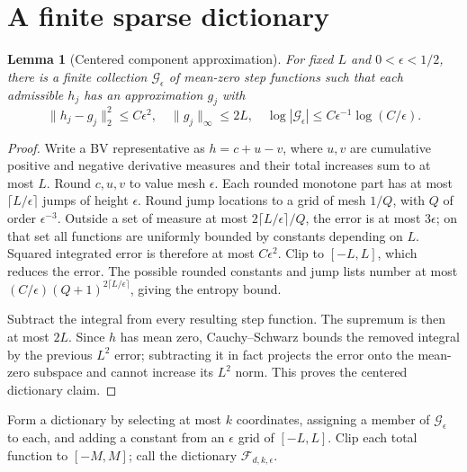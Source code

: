 \documentclass[11pt]{article}
\newtheorem{lemma}[theorem]{Lemma}
\theoremstyle{remark}
\begin{document}
\section{A finite sparse dictionary}
\begin{lemma}[Centered component approximation]\label{component}
For fixed $L$ and $0<\epsilon<1/2$, there is a finite collection $\mathcal G_\epsilon$ of mean-zero step functions such that each admissible $h_j$ has an approximation $g_j$ with
\[
 \|h_j-g_j\|_2^2\leq C\epsilon^2,
 \quad \|g_j\|_\infty\leq2L,
 \quad \log|\mathcal G_\epsilon|
                 \leq C\epsilon^{-1}\log(C/\epsilon).
\]
\end{lemma}
\begin{proof}
Write a BV representative as $h=c+u-v$, where $u,v$ are cumulative positive and negative derivative measures and their total increases sum to at most $L$. Round $c,u,v$ to value mesh $\epsilon$. Each rounded monotone part has at most $\lceil L/\epsilon\rceil$ jumps of height $\epsilon$. Round jump locations to a grid of mesh $1/Q$, with $Q$ of order $\epsilon^{-3}$. Outside a set of measure at most $2\lceil L/\epsilon\rceil/Q$, the error is at most $3\epsilon$; on that set all functions are uniformly bounded by constants depending on $L$. Squared integrated error is therefore at most $C\epsilon^2$. Clip to $[-L,L]$, which reduces the error. The possible rounded constants and jump lists number at most $(C/\epsilon)(Q+1)^{2\lceil L/\epsilon\rceil}$, giving the entropy bound.

Subtract the integral from every resulting step function. The supremum is then at most $2L$. Since $h$ has mean zero, Cauchy--Schwarz bounds the removed integral by the previous $L^2$ error; subtracting it in fact projects the error onto the mean-zero subspace and cannot increase its $L^2$ norm. This proves the centered dictionary claim.
\end{proof}

Form a dictionary by selecting at most $k$ coordinates, assigning a member of $\mathcal G_\epsilon$ to each, and adding a constant from an $\epsilon$ grid of $[-L,L]$. Clip each total function to $[-M,M]$; call the dictionary $\mathcal F_{d,k,\epsilon}$.
\end{document}
